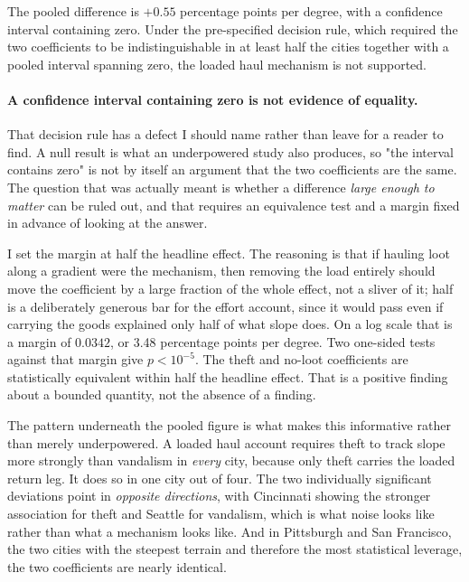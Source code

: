 \documentclass[10pt,letterpaper]{article}
\begin{document}
The pooled difference is $+0.55$ percentage points per degree, with a confidence
interval containing zero. Under the pre-specified decision rule, which required the
two coefficients to be indistinguishable in at least half the cities together with a
pooled interval spanning zero, the loaded haul mechanism is not supported.

\paragraph{A confidence interval containing zero is not evidence of equality.} That
decision rule has a defect I should name rather than leave for a reader to find. A
null result is what an underpowered study also produces, so "the interval contains
zero" is not by itself an argument that the two coefficients are the same. The
question that was actually meant is whether a difference \emph{large enough to
matter} can be ruled out, and that requires an equivalence test and a margin fixed
in advance of looking at the answer.

I set the margin at half the headline effect. The reasoning is that if hauling loot
along a gradient were the mechanism, then removing the load entirely should move the
coefficient by a large fraction of the whole effect, not a sliver of it; half is a
deliberately generous bar for the effort account, since it would pass even if
carrying the goods explained only half of what slope does. On a log scale that is a
margin of $0.0342$, or 3.48 percentage points per degree. Two one-sided tests
against that margin give $p < 10^{-5}$. The theft and no-loot coefficients are
statistically equivalent within half the headline effect. That is a positive
finding about a bounded quantity, not the absence of a finding.

The pattern underneath the pooled figure is what makes this informative rather than
merely underpowered. A loaded haul account requires theft to track slope more
strongly than vandalism in \emph{every} city, because only theft carries the loaded
return leg. It does so in one city out of four. The two individually significant
deviations point in \emph{opposite directions}, with Cincinnati showing the stronger
association for theft and Seattle for vandalism, which is what noise looks like
rather than what a mechanism looks like. And in Pittsburgh and San Francisco, the two
cities with the steepest terrain and therefore the most statistical leverage, the two
coefficients are nearly identical.
\end{document}
